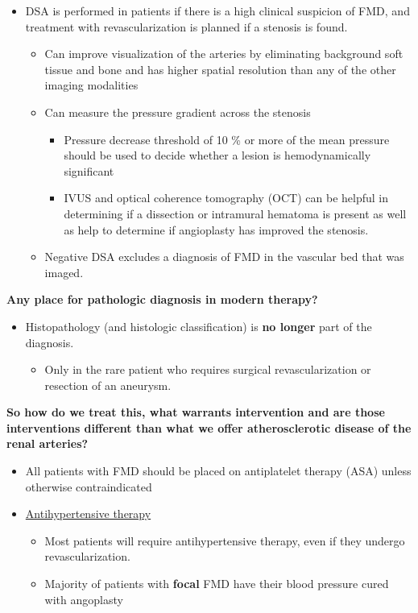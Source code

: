 \documentclass[
]{book}
\providecommand{\tightlist}{%
  \setlength{\itemsep}{0pt}\setlength{\parskip}{0pt}}
\begin{document}
\begin{itemize}
\item
  DSA is performed in patients if there is a high clinical suspicion
  of FMD, and treatment with revascularization is planned if a
  stenosis is found.

  \begin{itemize}
  \item
    Can improve visualization of the arteries by eliminating
    background soft tissue and bone and has higher spatial
    resolution than any of the other imaging modalities
  \item
    Can measure the pressure gradient across the stenosis

    \begin{itemize}
    \item
      Pressure decrease threshold of 10 \% or more of the mean
      pressure should be used to decide whether a lesion is
      hemodynamically significant
    \item
      IVUS and optical coherence tomography (OCT) can be helpful
      in determining if a dissection or intramural hematoma is
      present as well as help to determine if angioplasty has
      improved the stenosis.
    \end{itemize}
  \item
    Negative DSA excludes a diagnosis of FMD in the vascular bed
    that was imaged.
  \end{itemize}
\end{itemize}

\textbf{Any place for pathologic diagnosis in modern therapy?}

\begin{itemize}
\item
  Histopathology (and histologic classification) is \textbf{no longer} part
  of the diagnosis.

  \begin{itemize}
  \tightlist
  \item
    Only in the rare patient who requires surgical revascularization
    or resection of an aneurysm.
  \end{itemize}
\end{itemize}

\textbf{So how do we treat this, what warrants intervention and are those
interventions different than what we offer atherosclerotic disease of
the renal arteries?}

\begin{itemize}
\item
  All patients with FMD should be placed on antiplatelet therapy (ASA)
  unless otherwise contraindicated
\item
  \uline{Antihypertensive therapy}

  \begin{itemize}
  \item
    Most patients will require antihypertensive therapy, even if
    they undergo revascularization.
  \item
    Majority of patients with \textbf{focal} FMD have their blood
    pressure cured with angoplasty
  \end{itemize}
\end{itemize}
\end{document}
